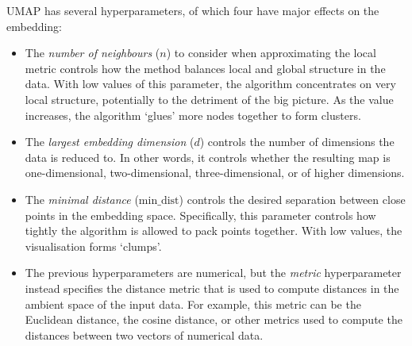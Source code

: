 UMAP has several hyperparameters, of which four have major effects on the embedding:
\begin{itemize}
  \item The \emph{number of neighbours} ($n$) to consider when approximating the local metric controls how the method balances local and global structure in the data.
        With low values of this parameter, the algorithm concentrates on very local structure, potentially to the detriment of the big picture.
        As the value increases, the algorithm `glues' more nodes together to form clusters.
  \item The \emph{largest embedding dimension} ($d$) controls the number of dimensions the data is reduced to.
        In other words, it controls whether the resulting map is one-dimensional, two-dimensional, three-dimensional, or of higher dimensions.
  \item The \emph{minimal distance} ($\mathrm{min\_dist}$) controls the desired separation between close points in the embedding space.
        Specifically, this parameter controls how tightly the algorithm is allowed to pack points together.
        With low values, the visualisation forms `clumps'.
  \item The previous hyperparameters are numerical, but the \emph{metric} hyperparameter instead specifies the distance metric that is used to compute distances in the ambient space of the input data.
        For example, this metric can be the Euclidean distance, the cosine distance, or other metrics used to compute the distances between two vectors of numerical data.
\end{itemize}



